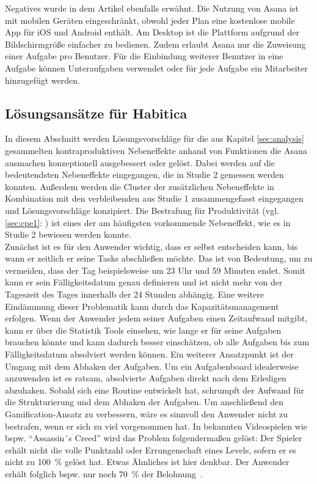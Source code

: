 \documentclass[sigconf, nonacm]{acmart}
\begin{document}
Negatives wurde in dem Artikel ebenfalls erwähnt. Die Nutzung von Asana ist mit mobilen Geräten eingeschränkt, obwohl jeder Plan eine kostenlose mobile App für iOS und Android enthält. Am Desktop ist die Plattform aufgrund der Bildschirmgröße einfacher zu bedienen. Zudem erlaubt Asana nur die Zuweisung einer Aufgabe pro Benutzer. Für die Einbindung weiterer Benutzer in eine Aufgabe können Unteraufgaben verwendet oder für jede Aufgabe ein Mitarbeiter hinzugefügt werden.

\subsection{Lösungsansätze für Habitica}\label{sec:solutions_for_habitica}
In diesem Abschnitt werden Lösungsvorschläge für die aus Kapitel \ref{sec:analysis} gesammelten kontraproduktiven Nebeneffekte anhand von Funktionen die Asana ausmachen konzeptionell ausgebessert oder gelöst.
Dabei werden auf die bedeutendsten Nebeneffekte eingegangen, die in Studie 2 gemessen werden konnten. Außerdem werden die Cluster der zusätzlichen Nebeneffekte in Kombination mit den verbleibenden aus Studie 1 zusammengefasst eingegangen und Lösungsvorschläge konzipiert.
Die Bestrafung für Produktivität (vgl. \ref{sec:cpe1}: ) ist eines der am häufigsten vorkommende Nebeneffekt, wie es in Studie 2 bewiesen werden konnte. \\
Zunächst ist es für den Anwender wichtig, dass er selbst entscheiden kann, bis wann er zeitlich er seine Tasks abschließen möchte. Das ist von Bedeutung, um zu vermeiden, dass der Tag beispielsweise um 23 Uhr und 59 Minuten endet. Somit kann er sein Fälligkeitsdatum genau definieren und ist nicht mehr von der Tageszeit des Tages innerhalb der 24 Stunden abhängig. Eine weitere Eindämmung dieser Problematik kann durch das Kapazitätsmanagement erfolgen. Wenn der Anwender jedem seiner Aufgaben einen Zeitaufwand mitgibt, kann er über die Statistik Tools einsehen, wie lange er für seine Aufgaben brauchen könnte und kann dadurch besser einschätzen, ob alle Aufgaben bis zum Fälligkeitsdatum absolviert werden können. Ein weiterer Ansatzpunkt ist der Umgang mit dem Abhaken der Aufgaben. Um ein Aufgabenboard idealerweise anzuwenden ist es ratsam, absolvierte Aufgaben direkt nach dem Erledigen abzuhaken. Sobald sich eine Routine entwickelt hat, schrumpft der Aufwand für die Strukturierung und dem Abhaken der Aufgaben.
Um anschließend den Gamification-Ansatz zu verbessern, wäre es sinnvoll den Anwender nicht zu bestrafen, wenn er sich zu viel vorgenommen hat. In bekannten Videospielen wie bspw. \enquote{Assassin´s Creed} wird das Problem folgendermaßen gelöst: Der Spieler erhält nicht die volle Punktzahl oder Errungenschaft eines Levels, sofern er es nicht zu 100~\% gelöst hat. Etwas Ähnliches ist hier denkbar. Der Anwender erhält folglich bspw. nur noch 70~\% der Belohnung~\cite{noauthor_assassins_nodate}.
\end{document}
